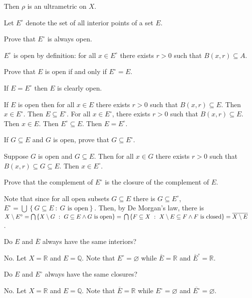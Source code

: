 \documentclass{homework}
\begin{document}
  Then $\rho$ is an ultrametric on $X$.


 Let $E^\circ$ denote the set of all interior points of a set $E$. 

\begin{subproblems}
  \subproblem Prove that $E^\circ$ is always open.

    \solution $E^\circ$ is open by definition: 
    for all $x \in E^\circ$ there exists $r > 0$ such that 
    $B(x, r) \subseteq A$.

  \subproblem Prove that $E$ is open if and only if $E^\circ = E$.
  
    \solution If $E = E^\circ$ then $E$ is clearly open.

    If $E$ is open then for all $x \in E$ there exists $r > 0$ such that 
      $B(x, r) \subseteq E$.
    Then $x \in E^\circ$.
    Then $E \subseteq E^\circ$.
    For all $x \in E^\circ$, there exists $r > 0$ such that 
      $B(x, r) \subseteq E$.
    Then $x \in E$.
    Then $E^\circ \subseteq E$.
    Then $E = E^\circ$.

  \subproblem If $G \subseteq E$ and $G$ is open, prove that 
  $G \subseteq E^\circ$.
  
    \solution Suppose $G$ is open and $G \subseteq E$.
    Then for all $x \in G$ there exists $r > 0$ such that 
      $B(x, r) \subseteq G \subseteq E$.
    Then $x \in E^\circ$.

  \subproblem Prove that the complement of $E^\circ$ is the closure 
  of the complement of $E$.
  
    \solution Note that since for all open subsets $G \subseteq E$ there 
      is $G \subseteq E^\circ$, 
      $E^\circ = \bigcup \left \{ G \subseteq E ~ : ~ 
      G \text{ is open} \right \}$.
    Then, by De Morgan's law, there is $X \setminus E^\circ = \bigcap 
      \left \{ X \setminus G ~ : ~ 
      G \subseteq E \wedge G \text{ is open} \right \} = \\
      \bigcap \left \{ F \subseteq X ~ : ~ 
      X \setminus E \subseteq F \wedge F \text{ is closed} \right \} = 
      \overline{X \setminus E}$.

  \subproblem Do $E$ and $\overline E$ always have the same interiors?
  
    \solution No.
    Let $X = \mathbb R$ and $E = \mathbb Q$.
    Note that $E^\circ = \varnothing$ while $\overline E = \mathbb R$ and 
      $\overline E^\circ = \mathbb R$.

  \subproblem Do $E$ and $E^\circ$ always have the same closures?
  
    \solution No.
    Let $X = \mathbb R$ and $E = \mathbb Q$.
    Note that $\overline E = \mathbb R$ while $E^\circ = \varnothing$ and
      $\overline{E^\circ} = \varnothing$.
\end{subproblems}
\end{document}
